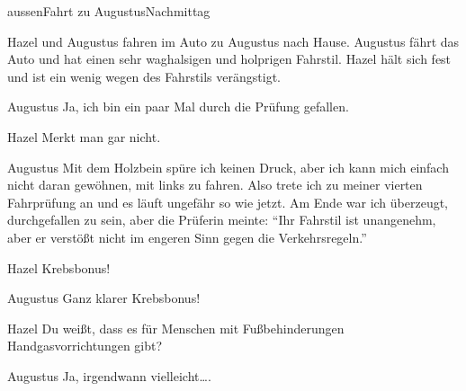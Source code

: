 \documentclass[12pt]{article}
\begin{document}
    \begin{scene}{aussen}{Fahrt zu Augustus}{Nachmittag}
        \begin{scenedescription}
            \gls{Hazel} und \gls{Augustus} fahren im Auto zu \gls{Augustus} nach Hause.
            \gls{Augustus} fährt das Auto und hat einen sehr waghalsigen und holprigen Fahrstil.
            \gls{Hazel} hält sich fest und ist ein wenig wegen des Fahrstils verängstigt.
        \end{scenedescription}


        \begin{dialog}{Augustus}
            Ja, ich bin ein paar Mal durch die Prüfung gefallen.
        \end{dialog}

        \begin{dialog}[unglaubwürdig]{Hazel}
            Merkt man gar nicht.
        \end{dialog}

        \begin{dialog}{Augustus}
            Mit dem Holzbein spüre ich keinen Druck, aber ich kann mich einfach nicht daran gewöhnen, mit links zu fahren.
            Also trete ich zu meiner vierten Fahrprüfung an und es läuft ungefähr so wie jetzt.
            Am Ende war ich überzeugt, durchgefallen zu sein, aber die Prüferin meinte:
            ``Ihr Fahrstil ist unangenehm, aber er verstößt nicht im engeren Sinn gegen die Verkehrsregeln.''
        \end{dialog}

        \begin{dialog}[lächelnd]{Hazel}
            Krebsbonus!
        \end{dialog}

        \begin{dialog}{Augustus}
            Ganz klarer Krebsbonus!
        \end{dialog}

        \begin{dialog}{Hazel}
            Du weißt, dass es für Menschen mit Fußbehinderungen Handgasvorrichtungen gibt?
        \end{dialog}

        \begin{dialog}[entmutigt]{Augustus}
            Ja, irgendwann vielleicht….
        \end{dialog}


\end{scene}
\end{document}
